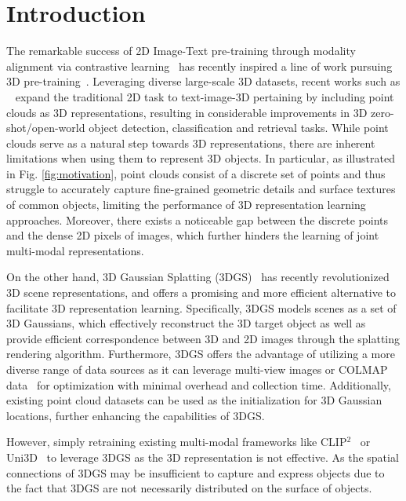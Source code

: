 \section{Introduction}
\label{sec:intro}
 
The remarkable success of 2D Image-Text pre-training through modality alignment via contrastive learning~\citep{radford2021learning, sun2023eva, fang2023eva, schuhmann2022laion, qi2020imagebert, changpinyo2021conceptual, hong2021gilbert} has recently inspired a line of work pursuing 3D pre-training~\citep{xue2023ulip, xue2023ulip2, zeng2023clip2, zhou2024uni3d, liu2024openshape, zhang2022pointclip, huang2023clip2point, afham2022crosspoint}.
Leveraging diverse large-scale 3D datasets, recent works such as ~\citep{liu2024openshape, zhou2024uni3d} expand the traditional 2D task to text-image-3D pertaining by including point clouds as 3D representations, resulting in considerable improvements in 3D zero-shot/open-world object detection, classification and retrieval tasks.
While point clouds serve as a natural step towards 3D representations, there are inherent limitations when using them to represent 3D objects. 
In particular, as illustrated in Fig. \ref{fig:motivation}, point clouds consist of a discrete set of points and thus struggle to accurately capture fine-grained geometric details and surface textures of common objects, limiting the performance of 3D representation learning approaches.
Moreover, there exists a noticeable gap between the discrete points and the dense 2D pixels of images, which further hinders the learning of joint multi-modal representations.

On the other hand, 3D Gaussian Splatting (3DGS)~\citep{kerbl20233d} has recently revolutionized 3D scene representations, and offers a promising and more efficient alternative to facilitate 3D representation learning. Specifically, 3DGS models scenes as a set of 3D Gaussians, which effectively reconstruct the 3D target object as well as provide efficient correspondence between 3D and 2D images through the splatting rendering algorithm.
Furthermore, 3DGS offers the advantage of utilizing a more diverse range of data sources as it can leverage multi-view images or COLMAP data~\citep{yu2023mvimgnet, schonberger2016structure} for optimization with minimal overhead and collection time. Additionally, existing point cloud datasets can be used as the initialization for 3D Gaussian locations, further enhancing the capabilities of 3DGS.

However, simply retraining existing multi-modal frameworks like CLIP$^2$~\citep{zeng2023clip2} or Uni3D~\citep{zhou2024uni3d} to leverage 3DGS as the 3D representation is not effective. 
As the spatial connections of 3DGS may be insufficient to capture and express objects due to the fact that 3DGS are not necessarily distributed on the surface of objects.

